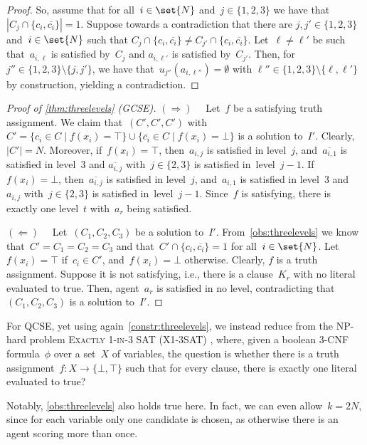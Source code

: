 \documentclass[10pt,a4paper,twocolumn]{article}
\theoremstyle{plain}
\theoremstyle{definition}
\theoremstyle{remark}
\newcommand{\prob}[1]{\textnormal{\textsc{#1}}}
\newcommand{\RD}{$(\Rightarrow)\quad$}
\newcommand{\LD}{$(\Leftarrow)\quad$}
\newcommand{\cocl}[1]{\textrm{#1}}
\newcommand{\NP}{\cocl{NP}}
\newcommand{\false}{\bot}
\newcommand{\true}{\top}
\newcommand{\ol}[1]{\overline{#1}}
\newcommand{\smlaAcr}{\prob{GCSE}}
\newcommand{\fmlaAcr}{\prob{QCSE}}
\newcommand{\xOTsatTsc}{\prob{Exactly 1-in-3 SAT}}
\newcommand{\xOTsatAcr}{\prob{X1-3SAT}}
\begin{document}
{{\begin{proof}
  So,
  assume that for all~$i\in\set{N}$ and~$j\in\{1,2,3\}$ we have that~$|C_j\cap \{c_i,\ol{c_i}\}|=1$.
  Suppose towards a contradiction that there are $j,j'\in\{1,2,3\}$ and~$i\in\set{N}$ such that $C_j\cap \{c_i,\ol{c_i}\} \neq C_{j'}\cap \{c_i,\ol{c_i}\}$.
  Let~$\ell\neq \ell'$ be such that~$a_{i,\ell}$ is satisfied by~$C_j$ and $a_{i,\ell'}$ is satisfied by~$C_{j'}$.
  Then, for~$j''\in\{1,2,3\}\setminus\{j,j'\}$,
  we have that~$u_{j''}(a_{i,\ell''})=\emptyset$ with $\ell''\in\{1,2,3\}\setminus\{\ell,\ell'\}$ by construction,
  yielding a contradiction.
  \end{proof}
}

\begin{proof}[Proof of \cref{thm:threelevels} (\smlaAcr)]
 \RD{}
 Let~$f$ be a satisfying truth assignment.
 We claim that~$(C',C',C')$ with
 $C'=\{c_i\in C \mid f(x_i)=\true\} \cup \{\ol{c_i}\in C \mid f(x_i)=\false \}$ is a solution to~$I'$.
 Clearly,~$|C'|=N$.
 Moreover,
 if~$f(x_i)=\true$,
 then~$a_{i,j}$ is satisfied in level~$j$,
 and~$\ol{a_{i,1}}$ is satisfied in level~$3$ and
 $\ol{a_{i,j}}$ with~$j\in\{2,3\}$ is satisfied in~level~$j-1$.
 If~$f(x_i)=\false$,
 then~$\ol{a_{i,j}}$ is satisfied in level~$j$,
 and~$a_{i,1}$ is satisfied in level~$3$ and
 $a_{i,j}$ with~$j\in\{2,3\}$ is satisfied in~level~$j-1$.
 Since~$f$ is satisfying,
 there is exactly one level~$t$ with~$a_r$ being satisfied.
 
 \LD{}
 Let~$(C_1,C_2,C_3)$ be a solution to~$I'$.
 From~\cref{obs:threelevels} we know that~$C'=C_1=C_2=C_3$ 
 and that~$C'\cap \{c_i,\ol{c_i}\}=1$ for all~$i\in\set{N}$.
 Let~$f(x_i)=\true$ if~$c_i\in C'$,
 and~$f(x_i)=\false$ otherwise.
 Clearly,
 $f$ is a truth assignment.
 Suppose it is not satisfying,
 i.e.,
 there is a clause~$K_r$ with no literal evaluated to true.
 Then,
 agent~$a_r$ is satisfied in no level,
 contradicting that~$(C_1,C_2,C_3)$ is a solution to~$I'$.
\end{proof}

For \fmlaAcr{},
yet using again~\cref{constr:threelevels},
we instead reduce from the \NP-hard problem
\xOTsatTsc{} (\xOTsatAcr) 
\cite{Schaefer78},
where,
given
a boolean 3-CNF formula~$\phi$ over a set~$X$ of variables,
the question is whether there is a truth assignment~$f\colon X \to \{\false,\true\}$ 
such that for every clause,
there is exactly one literal evaluated to true?

%
%
%
%
%
%
%
%
%
%
%
%
%
%
%
%

\noindent
Notably,
\cref{obs:threelevels} also holds true here.
In fact,
we can even allow~$k=2N$,
since for each variable only one candidate is chosen,
as otherwise there is an agent scoring more than once.
%
%
%
%
%

}
\end{document}
